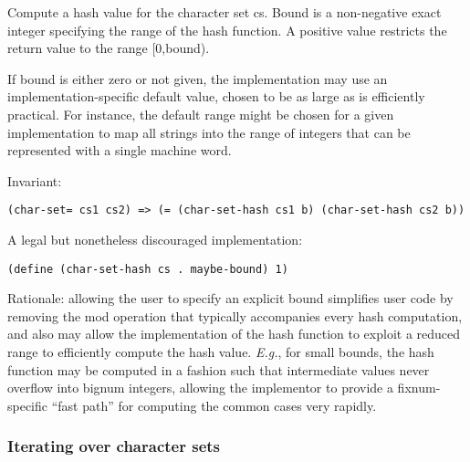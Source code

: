 \begin{entry}{%
  }

Compute a hash value for the character set cs. Bound is a non-negative
exact integer specifying the range of the hash function. A positive
value restricts the return value to the range {[}0,bound).

If bound is either zero or not given, the implementation may use an
implementation-specific default value, chosen to be as large as is
efficiently practical. For instance, the default range might be chosen
for a given implementation to map all strings into the range of
integers that can be represented with a single machine word.

Invariant:

\begin{verbatim}
(char-set= cs1 cs2) => (= (char-set-hash cs1 b) (char-set-hash cs2 b))
\end{verbatim}

A legal but nonetheless discouraged implementation:

\begin{verbatim}
(define (char-set-hash cs . maybe-bound) 1)
\end{verbatim}

Rationale: allowing the user to specify an explicit bound simplifies
user code by removing the mod operation that typically accompanies
every hash computation, and also may allow the implementation of the
hash function to exploit a reduced range to efficiently compute the
hash value. \emph{E.g.}, for small bounds, the hash function may be
computed in a fashion such that intermediate values never overflow
into bignum integers, allowing the implementor to provide a
fixnum-specific ``fast path'' for computing the common cases very
rapidly.
\end{entry}

\subsubsection{Iterating over character sets}



